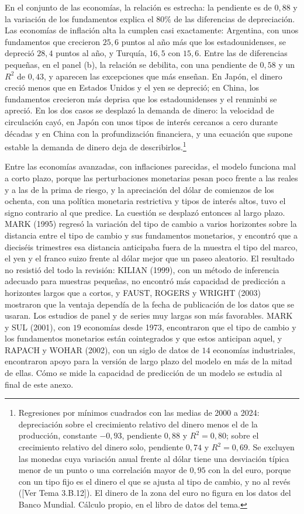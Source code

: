 \documentclass[10pt,a4paper]{article}
\newcommand{\authorfont}[1]{{\fontfamily{EBGaramond-TLF}\selectfont #1}}
\newcounter{anexo}
\begin{document}
En el conjunto de las economías, la relación es estrecha: la pendiente es de $0{,}88$ y la variación de los fundamentos explica el $80\%$ de las diferencias de depreciación. Las economías de inflación alta la cumplen casi exactamente: Argentina, con unos fundamentos que crecieron $25{,}6$ puntos al año más que los estadounidenses, se depreció $28{,}4$ puntos al año, y Turquía, $16{,}5$ con $15{,}6$. Entre las de diferencias pequeñas, en el panel (b), la relación se debilita, con una pendiente de $0{,}58$ y un $R^2$ de $0{,}43$, y aparecen las excepciones que más enseñan. En Japón, el dinero creció menos que en Estados Unidos y el yen se depreció; en China, los fundamentos crecieron más deprisa que los estadounidenses y el renminbi se apreció. En los dos casos se desplazó la demanda de dinero: la velocidad de circulación cayó, en Japón con unos tipos de interés cercanos a cero durante décadas y en China con la profundización financiera, y una ecuación que supone estable la demanda de dinero deja de describirlos.\footnote{%
    Regresiones por mínimos cuadrados con las medias de 2000 a 2024: depreciación sobre el crecimiento relativo del dinero menos el de la producción, constante $-0{,}93$, pendiente $0{,}88$ y $R^2=0{,}80$; sobre el crecimiento relativo del dinero solo, pendiente $0{,}74$ y $R^2=0{,}69$. Se excluyen las monedas cuya variación anual frente al dólar tiene una desviación típica menor de un punto o una correlación mayor de $0{,}95$ con la del euro, porque con un tipo fijo es el dinero el que se ajusta al tipo de cambio, y no al revés ([\authorfont{Ver Tema 3.B.12}]). El dinero de la zona del euro no figura en los datos del Banco Mundial. Cálculo propio, en el libro de datos del tema.
}

Entre las economías avanzadas, con inflaciones parecidas, el modelo funciona mal a corto plazo, porque las perturbaciones monetarias pesan poco frente a las reales y a las de la prima de riesgo, y la apreciación del dólar de comienzos de los ochenta, con una política monetaria restrictiva y tipos de interés altos, tuvo el signo contrario al que predice. La cuestión se desplazó entonces al largo plazo. MARK (1995) regresó la variación del tipo de cambio a varios horizontes sobre la distancia entre el tipo de cambio y sus fundamentos monetarios, y encontró que a dieciséis trimestres esa distancia anticipaba fuera de la muestra el tipo del marco, el yen y el franco suizo frente al dólar mejor que un paseo aleatorio. El resultado no resistió del todo la revisión: KILIAN (1999), con un método de inferencia adecuado para muestras pequeñas, no encontró más capacidad de predicción a horizontes largos que a cortos, y FAUST, ROGERS y WRIGHT (2003) mostraron que la ventaja dependía de la fecha de publicación de los datos que se usaran. Los estudios de panel y de series muy largas son más favorables. MARK y SUL (2001), con $19$ economías desde 1973, encontraron que el tipo de cambio y los fundamentos monetarios están cointegrados y que estos anticipan aquel, y RAPACH y WOHAR (2002), con un siglo de datos de $14$ economías industriales, encontraron apoyo para la versión de largo plazo del modelo en más de la mitad de ellas. Cómo se mide la capacidad de predicción de un modelo se estudia al final de este anexo.
\end{document}
